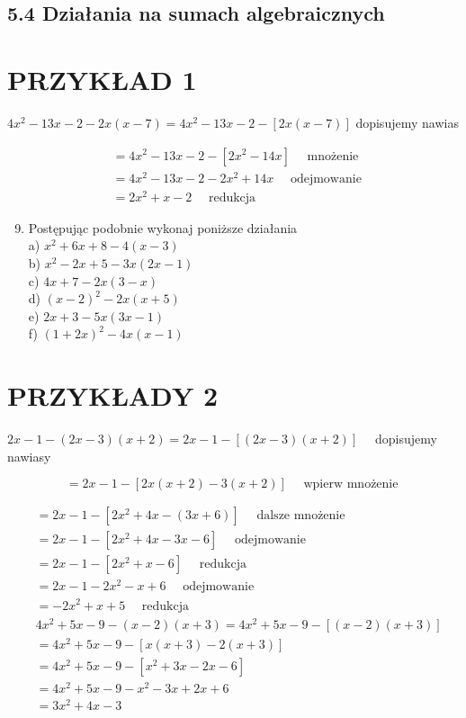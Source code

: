 \documentclass[10pt]{article}
\begin{document}
\subsection*{5.4 Działania na sumach algebraicznych}
\section*{PRZYKŁAD 1}
\(4 x^{2}-13 x-2-2 x(x-7)=4 x^{2}-13 x-2-[2 x(x-7)]\) dopisujemy nawias

\[
\begin{aligned}
& =4 x^{2}-13 x-2-\left[2 x^{2}-14 x\right] \quad \text { mnożenie } \\
& =4 x^{2}-13 x-2-2 x^{2}+14 x \quad \text { odejmowanie } \\
& =2 x^{2}+x-2 \quad \text { redukcja }
\end{aligned}
\]

\begin{enumerate}
  \setcounter{enumi}{8}
  \item Postępując podobnie wykonaj poniższe działania\\
a) \(x^{2}+6 x+8-4(x-3)\)\\
b) \(x^{2}-2 x+5-3 x(2 x-1)\)\\
c) \(4 x+7-2 x(3-x)\)\\
d) \((x-2)^{2}-2 x(x+5)\)\\
e) \(2 x+3-5 x(3 x-1)\)\\
f) \((1+2 x)^{2}-4 x(x-1)\)
\end{enumerate}

\section*{PRZYKŁADY 2}
\(2 x-1-(2 x-3)(x+2)=2 x-1-[(2 x-3)(x+2)] \quad\) dopisujemy nawiasy

\[
=2 x-1-[2 x(x+2)-3(x+2)] \quad \text { wpierw mnożenie }
\]

\[
\begin{aligned}
&=2 x-1- {\left[2 x^{2}+4 x-(3 x+6)\right] \quad \text { dalsze mnożenie } } \\
&=2 x-1-\left[2 x^{2}+4 x-3 x-6\right] \quad \text { odejmowanie } \\
&=2 x-1- {\left[2 x^{2}+x-6\right] \quad \text { redukcja } } \\
&=2 x-1-2 x^{2}-x+6 \quad \text { odejmowanie } \\
&=-2 x^{2}+x+5 \quad \text { redukcja } \\
& 4 x^{2}+5 x-9-(x-2)(x+3)=4 x^{2}+5 x-9-[(x-2)(x+3)] \\
&=4 x^{2}+5 x-9-[x(x+3)-2(x+3)] \\
&=4 x^{2}+5 x-9-\left[x^{2}+3 x-2 x-6\right] \\
&=4 x^{2}+5 x-9-x^{2}-3 x+2 x+6 \\
&=3 x^{2}+4 x-3
\end{aligned}
\]
\end{document}
